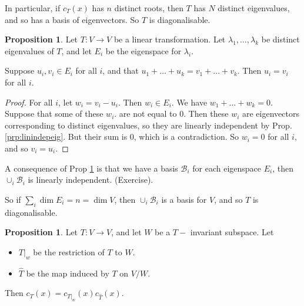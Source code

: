 \documentclass{article}
\theoremstyle{definition} \newtheorem*{definition}{Definition}
\newtheorem{proposition}[theorem]{Proposition}
\newcommand{\B}{\mathcal{B}}
\begin{document}
In particular, if $c_T(x)$ has $n$ distinct roots, then $T$ has $N$
distinct eigenvalues, and so has a basis of eigenvectors. So $T$ is
diagonalisable.\\

\begin{proposition}
  \label{prp:uivi}
  Let $T: V \rightarrow V$ be a linear transformation. Let 
  $\lambda_1, \dots , \lambda_k$ be distinct eigenvalues of $T$, and
  let $E_i$ be the eigenspace for $\lambda_i$.

  Suppose $u_i,v_i\in E_i$ for all $i$, and that $u_1 + \dots + u_k = v_1
  + \dots + v_k$. Then $u_i = v_i$ for all $i$.
\end{proposition}
\begin{proof}
  For all $i$, let $w_i =  v_i - u_i$. Then $w_i \in E_i$. 
  We have $w_1 + \dots + w_k = 0$.
  Suppose that some of these $w_i$. are not equal to 0. Then these
  $w_i$ are eigenvectors corresponding to distinct eigenvalues, so
  they are linearly independent by Prop. \ref{prp:linindepeig}. But
  their sum is 0, which is a contradiction. So $w_i = 0$ for all $i$,
  and so $v_i = u_i$.
\end{proof}



A consequence of Prop \ref{prp:uivi} is that we have a basis $\B_i$ for
each eigenspace $E_i$, then $\cup_i \B_i$ is linearly independent.
(Exercise).

So if $\sum_i \dim E_i = n = \dim V$, then $\cup_i \B_i$ is  a basis for
$V$, and so $T$ is diagonalisable.\\

\begin{proposition}
  \label{prp:prodchar}
  Let $T:V\rightarrow V$, and let $W$ be a $T-$ invariant subspace. Let
\begin{itemize}
  \item $T|_w$ be the restriction of $T$ to $W$.
  \item $\hat{T}$ be the map induced by $T$ on $V/W$.
\end{itemize}
Then $c_T(x) = c_{T|_w}(x) c_{\hat{T}}(x)$. 
\end{proposition}
\end{document}

